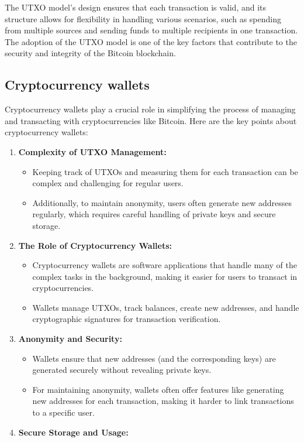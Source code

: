 \documentclass{report}
\begin{document}
The UTXO model's design ensures that each transaction is valid, and its structure allows for flexibility in handling various scenarios, such as spending from multiple sources and sending funds to multiple recipients in one transaction. The adoption of the UTXO model is one of the key factors that contribute to the security and integrity of the Bitcoin blockchain.
\subsection{Cryptocurrency wallets}
	Cryptocurrency wallets play a crucial role in simplifying the process of managing and transacting with cryptocurrencies like Bitcoin. Here are the key points about cryptocurrency wallets:\\
\begin{enumerate}
	\item \textbf{Complexity of UTXO Management:} 
	\begin{itemize}
		\item Keeping track of UTXOs and measuring them for each transaction can be complex and challenging for regular users.
		\item Additionally, to maintain anonymity, users often generate new addresses regularly, which requires careful handling of private keys and secure storage.
	\end{itemize}
	\item \textbf{The Role of Cryptocurrency Wallets:} 
	\begin{itemize}
		\item Cryptocurrency wallets are software applications that handle many of the complex tasks in the background, making it easier for users to transact in cryptocurrencies.
		\item Wallets manage UTXOs, track balances, create new addresses, and handle cryptographic signatures for transaction verification.
	\end{itemize}
	\item \textbf{Anonymity and Security:}
	\begin{itemize}
		\item Wallets ensure that new addresses (and the corresponding keys) are generated securely without revealing private keys.
		\item For maintaining anonymity, wallets often offer features like generating new addresses for each transaction, making it harder to link transactions to a specific user.
	\end{itemize}
	\item \textbf{Secure Storage and Usage:}

\end{enumerate}
\end{document}
